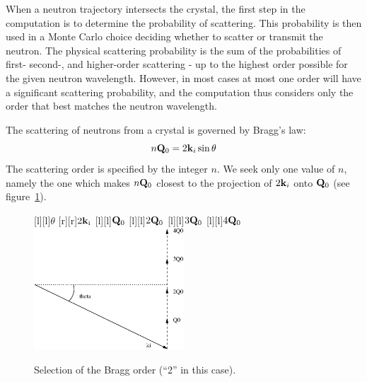 When a neutron trajectory intersects the crystal, the first step in the
computation is to determine the probability of scattering. This
probability is then used in a Monte Carlo choice deciding whether to
scatter or transmit the neutron. The physical scattering probability is the sum
of the probabilities of first- second-, and higher-order scattering -
up to the highest order possible for the given neutron wavelength.
However, in most cases at most one order will have a
significant scattering probability, and the computation thus considers
only the order that best matches the neutron wavelength.

The scattering of neutrons from a crystal is governed by Bragg's law:
\begin{equation}
n{\bf Q}_0 = 2{\bf k}_i\sin\theta
\end{equation}
The scattering order is specified by the integer $n$. We seek only one
value of $n$, namely the one which makes
$n {\bf Q}_0$ closest to the projection of $2{\bf k}_i$ onto ${\bf Q}_0$
(see figure~\ref{f:mosaic_order}).
%
%
\begin{figure}
  \begin{center}
    [l][l]{$\theta$}
    [r][r]{$2{\bf k}_{\rm i}$}
    [l][l]{${\bf Q}_0$}
    [l][l]{$2{\bf Q}_0$}
    [l][l]{$3{\bf Q}_0$}
    [l][l]{$4{\bf Q}_0$}
    \includegraphics[width=0.5\textwidth]{figures/mosaic_order.eps}
  \end{center}
\caption{Selection of the Bragg order (``2'' in this case).}
\label{f:mosaic_order}
\end{figure}
%

